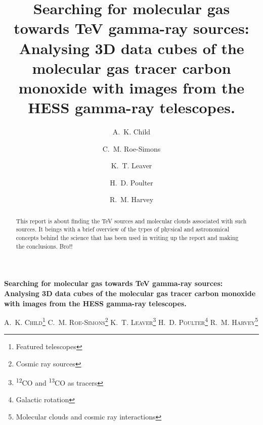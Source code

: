 \documentclass[a4paper, titlepage, oneside]{article}
\newcommand{\elem}[2]{\textsuperscript{#1}{#2}}
\begin{document}
\title{\textbf{Searching for molecular gas towards TeV gamma-ray sources: Analysing 3D data cubes of the molecular gas tracer carbon monoxide with images from the HESS gamma-ray telescopes.}}
\author{A.~K. Child \and C.~M. Roe-Simons \and K.~T. Leaver \and H.~D. Poulter \and R.~M. Harvey}
\date{} %
\maketitle

\setcounter{page}{1}

\tableofcontents

\clearpage
\setcounter{page}{1}

\begin{center}
{\LARGE \textbf{Searching for molecular gas towards TeV gamma-ray sources: Analysing 3D data cubes of the molecular gas tracer carbon monoxide with images from the HESS gamma-ray telescopes.}}

\vspace{1.5em}

\textsc{A.~K. Child\footnote{Featured telescopes} \quad C.~M. Roe-Simons\footnote{Cosmic ray sources} \quad K.~T. Leaver\footnote{\elem{12}{CO} and \elem{13}{CO} as tracers} \quad H.~D. Poulter\footnote{Galactic rotation} \quad R.~M. Harvey\footnote{Molecular clouds and cosmic ray interactions}}
\end{center}

\vspace{2em}

\begin{minipage}{0.93\textwidth}
\begin{abstract}
This report is about finding the TeV sources and molecular clouds associated with such sources. It beings with a brief overview of the types of physical and astronomical concepts behind the science that has been used in writing up the report and making the conclusions. Bro!!
\end{abstract}
\end{minipage}

\end{document}
